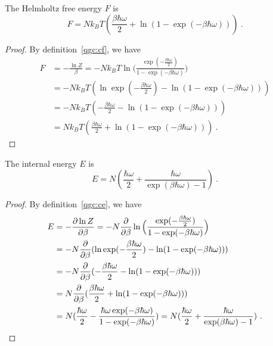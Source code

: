     The Helmholtz free energy $F$ is 
    \begin{equation*}
        F = N k_B T ( \frac{\beta \hbar \omega}{2} + \ln (1 - \exp(- \beta \hbar \omega))) ~.
    \end{equation*}
    \begin{proof}
        By definition~\eqref{qgc:cf}, we have
        \begin{equation*}
        \begin{aligned}
            F & = - \frac{\ln Z}{\beta} = - N k_B T \ln \Big ( \frac{\exp(- \frac{\beta \hbar \omega}{2})}{1 - \exp(- \beta \hbar \omega)} \Big) \\ & = - N k_B T ( \ln \exp(- \frac{\beta \hbar \omega}{2}) - \ln (1 - \exp(- \beta \hbar \omega) )) \\ & = - N k_B T ( - \frac{\beta \hbar \omega}{2} - \ln (1 - \exp(- \beta \hbar \omega))) \\ & = N k_B T ( \frac{\beta \hbar \omega}{2} + \ln (1 - \exp(- \beta \hbar \omega))) ~.
        \end{aligned}
        \end{equation*}
    \end{proof}

    The internal energy $E$ is 
    \begin{equation*}
        E = N ( \frac{\hbar \omega}{2} + \frac{\hbar \omega}{\exp(\beta \hbar \omega) - 1} ) ~.
    \end{equation*}
    \begin{proof}
        By definition~\eqref{qgc:ce}, we have
        \begin{equation*}
        \begin{aligned}
            E & = - \frac{\partial\ln Z}{\partial\beta} = - N \frac{\partial}{\partial\beta} \ln \Big ( \frac{\exp(- \frac{\beta \hbar \omega}{2})}{1 - \exp(- \beta \hbar \omega)} \Big) \\ & = - N \frac{\partial}{\partial\beta} ( \ln \exp(- \frac{\beta \hbar \omega}{2}) - \ln (1 - \exp(- \beta \hbar \omega) )) \\ & = - N \frac{\partial}{\partial\beta} ( - \frac{\beta \hbar \omega}{2} - \ln (1 - \exp(- \beta \hbar \omega))) \\ & = N \frac{\partial}{\partial\beta} ( \frac{\beta \hbar \omega}{2} + \ln (1 - \exp(- \beta \hbar \omega))) \\ & = N ( \frac{\hbar \omega}{2} - \frac{\hbar \omega \exp(-\beta \hbar \omega)}{1 - \exp(- \beta \hbar \omega)} ) = N ( \frac{\hbar \omega}{2} + \frac{\hbar \omega}{\exp(\beta \hbar \omega) - 1} ) ~.
        \end{aligned}
        \end{equation*}
    \end{proof}

